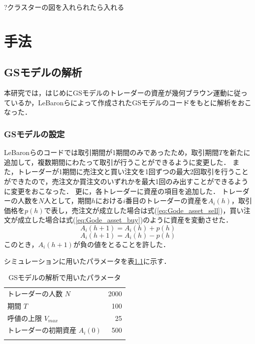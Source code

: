 \documentclass[titlepage]{jsreport}
\begin{document}
?クラスターの図を入れられたら入れる





\chapter{手法} \label{chap:method}
\section{GSモデルの解析}
本研究では，はじめにGSモデルのトレーダーの資産が幾何ブラウン運動に従っているか，LeBaronらによって作成されたGSモデルのコード\cite{Gode_and_Sunder_code}をもとに解析をおこなった．

\subsection{GSモデルの設定}
LeBaronらのコードでは取引期間が1期間のみであったため，取引期間$T$を新たに追加して，複数期間にわたって取引が行うことができるように変更した．
また，トレーダーが1期間に売注文と買い注文を1回ずつの最大2回取引を行うことができたので，売注文か買注文のいずれかを最大1回のみ出すことができるように変更をおこなった．
更に，各トレーダーに資産の項目を追加した．
トレーダーの人数を$N$人として，期間$h$における$i$番目のトレーダーの資産を$A_i(h)$，取引価格を$p(h)$で表し，売注文が成立した場合は式(\ref{eq:Gode_asset_sell})，買い注文が成立した場合は式(\ref{eq:Gode_asset_buy})のように資産を変動させた．
\begin{equation}
    A_i(h + 1) = A_i(h) + p(h) \label{eq:Gode_asset_sell}
\end{equation}
\begin{equation}
    A_i(h + 1) = A_i(h) - p(h) \label{eq:Gode_asset_buy}
\end{equation}
このとき，$A_i(h + 1)$が負の値をとることを許した．

シミュレーションに用いたパラメータを表\ref{tbl:Gode_param}に示す．

\begin{table}[htbp]
    \begin{center}
        \caption{GSモデルの解析で用いたパラメータ}
        \begin{tabular}{lr}
            \hline\hline
            トレーダーの人数 $N$          & 2000 \\
            期間 $T$                      & 100  \\
            呼値の上限 $V_{max} $         & 25   \\
            トレーダーの初期資産 $A_i(0)$ & 500  \\ \hline
            \label{tbl:Gode_param}
        \end{tabular}
    \end{center}
\end{table}
\end{document}
